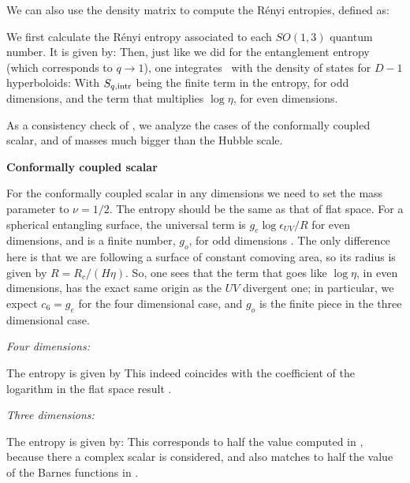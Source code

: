 
We can also use the density matrix to compute the R\'enyi entropies, defined as:
\eqn{}

We first calculate the R\'enyi entropy associated to each $SO(1,3)$ quantum number. It is given by:
\eqn{}
Then, just like we did for the entanglement entropy (which corresponds to $q\to1$), one integrates \renpmod\ with the density of states for $D-1$ hyperboloids:
\eqn{}
With $S_{q,\rm intr}$ being the finite term in the entropy, for odd dimensions, and the term that multiplies $\log \eta$, for even dimensions.


As a consistency check of \entfinal, we analyze the cases of the conformally coupled scalar, and of masses much bigger than the Hubble scale.

{\bf Conformally coupled scalar}

For the conformally coupled scalar in any dimensions we need to
 set the mass parameter to $\nu=1/2$. The entropy should be the same as that of flat space. For a spherical entangling surface, the universal term is $g_e \log \epsilon_{UV}/R$ for even dimensions, and is a finite number, $g_o$, for odd dimensions . The only difference here is that we are following a surface of constant comoving area, so its radius is given by $R=R_c/(H\eta)$. So, one sees that the term that goes like $\log \eta$, in even dimensions, has the exact same origin as the $UV$ divergent one; in particular, we expect $c_6=g_e$ for the four dimensional case, and $g_o$ is the finite piece in the three dimensional case.

{\it Four dimensions:}

The entropy is given by \entelgo
\eqn{}
This indeed coincides with the coefficient of the logarithm in the flat space result
 \CasiniKT .

{\it Three dimensions:}

The entropy is given by:
\eqn{}
This corresponds to half the value computed in \KlebanovUF , because there a complex scalar is considered, and also matches to half the value of the Barnes functions  in \Entsph.


